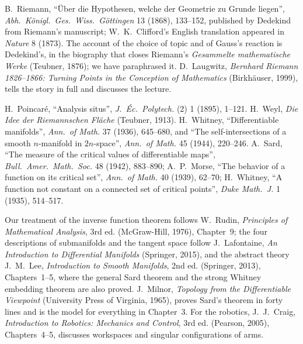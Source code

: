 B.~Riemann, ``\"Uber die Hypothesen, welche der Geometrie zu Grunde liegen'', \emph{Abh.\ K\"onigl.\ Ges.\ Wiss.\ G\"ottingen} 13 (1868), 133--152,
published by Dedekind from Riemann's manuscript; W.~K.~Clifford's English translation appeared in \emph{Nature} 8 (1873). The account of the choice of
topic and of Gauss's reaction is Dedekind's, in the biography that closes Riemann's \emph{Gesammelte mathematische Werke} (Teubner, 1876); we have
paraphrased it. D.~Laugwitz, \emph{Bernhard Riemann 1826--1866: Turning Points in the Conception of Mathematics} (Birkh\"auser, 1999), tells the
story in full and discusses the lecture.

H.~Poincar\'e, ``Analysis situs'', \emph{J.\ \'Ec.\ Polytech.} (2) 1 (1895), 1--121. H.~Weyl, \emph{Die Idee der Riemannschen Fl\"ache} (Teubner, 1913).
H.~Whitney, ``Differentiable manifolds'', \emph{Ann.\ of Math.} 37 (1936), 645--680, and ``The self-intersections of a smooth $n$-manifold in $2n$-space'',
\emph{Ann.\ of Math.} 45 (1944), 220--246. A.~Sard, ``The measure of the critical values of differentiable maps'', \emph{Bull.\ Amer.\ Math.\ Soc.} 48
(1942), 883--890; A.~P.~Morse, ``The behavior of a function on its critical set'', \emph{Ann.\ of Math.} 40 (1939), 62--70; H.~Whitney, ``A function not
constant on a connected set of critical points'', \emph{Duke Math.\ J.} 1 (1935), 514--517.

Our treatment of the inverse function theorem follows W.~Rudin, \emph{Principles of Mathematical Analysis}, 3rd ed. (McGraw-Hill, 1976), Chapter~9; the
four descriptions of submanifolds and the tangent space follow J.~Lafontaine, \emph{An Introduction to Differential Manifolds} (Springer, 2015), and the
abstract theory J.~M.~Lee, \emph{Introduction to Smooth Manifolds}, 2nd ed. (Springer, 2013), Chapters~1--5, where the general Sard theorem and the
strong Whitney embedding theorem are also proved. J.~Milnor, \emph{Topology from the Differentiable Viewpoint} (University Press of Virginia, 1965), proves
Sard's theorem in forty lines and is the model for everything in Chapter~3. For the robotics, J.~J.~Craig, \emph{Introduction to Robotics: Mechanics and
Control}, 3rd ed. (Pearson, 2005), Chapters~4--5, discusses workspaces and singular configurations of arms.
